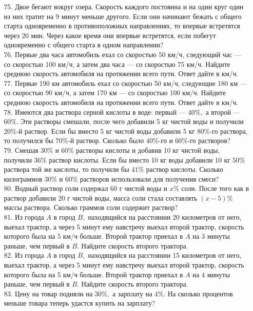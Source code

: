 75. Двое бегают вокруг озера. Скорость каждого постоянна и на один круг один из них тратит на 9 минут меньше другого. Если они начинают бежать с общего старта одновременно в противоположных направлениях, то впервые встретятся через 20 мин. Через какое время они впервые встретятся, если побегут одновременно с общего старта в одном направлении?\\
76. Первые два часа автомобиль ехал со скоростью 50 км/ч, следующий час --- со скоростью 100 км/ч, а затем два часа --- со скоростью 75 км/ч. Найдите среднюю скорость автомобиля на протяжении всего пути. Ответ дайте в км/ч.\\
77. Первые 190 км автомобиль ехал со скоростью 50 км/ч, следующие 180 км --- со скоростью 90 км/ч, а затем 170 км --- со скоростью 100 км/ч. Найдите среднюю скорость автомобиля на протяжении всего пути. Ответ дайте в км/ч.\\
78. Имеются два раствора серной кислоты в воде: первый --- $40\%,$ а второй --- $60\%.$ Эти растворы смешали, после чего добавили 5 кг чистой воды и получили $20\%$-й раствор. Если бы вместо 5 кг чистой воды добавили 5 кг $80\%$-го раствора, то получился бы $70\%$-й раствор. Сколько было $40\%$-го и $60\%$-го растворов?\\
79. Смешав $30\%$ и $60\%$ растворы кислоты и добавив 10 кг чистой воды, получили $36\%$ раствор кислоты. Если бы вместо 10 кг воды добавили 10 кг $50\%$ раствора той же кислоты, то получили бы $41\%$ раствор кислоты. Сколько килограммов $30\%$ и $60\%$ растворов использовали для получения смеси?\\
80. Водный раствор соли содержал 60 г чистой воды и $x\%$ соли. После того как в раствор добавили 20 г чистой воды, масса соли стала составлять $(x-5)\%$ массы раствора. Сколько граммов соли содержит раствор?\\
81. Из города $A$ в город $B,$ находящийся на расстоянии 20 километров от него, выехал трактор,
а через 5 минут ему навстречу выехал второй трактор, скорость которого была на 5 км/ч больше. Второй трактор приехал в $A$
на 3 минуты раньше, чем первый в $B.$ Найдите скорость второго трактора.\\
82. Из города $A$ в город $B,$ находящийся на расстоянии 15 километров от него, выехал трактор,
а через 5 минут ему навстречу выехал второй трактор, скорость которого была на 5 км/ч больше. Второй трактор приехал в $A$
на 4 минуты раньше, чем первый в $B.$ Найдите скорость второго трактора.\\
83. Цену на товар подняли на $30\%,$ а зарплату на $4\%.$ На сколько процентов меньше товара теперь удастся купить на зарплату?\\

